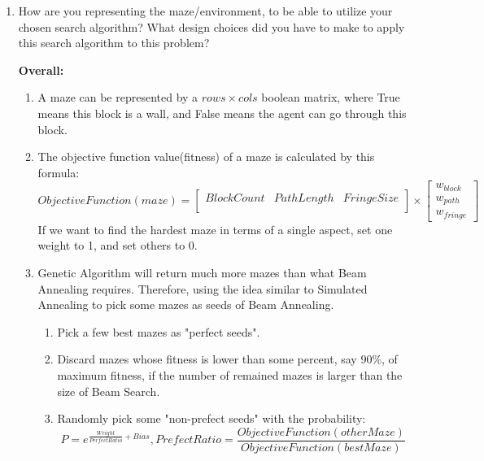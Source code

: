 \documentclass[letter]{article}
\begin{document}
\begin{enumerate}[resume]
\begin{enumerate}
			\item {How are you representing the maze/environment, to be able to utilize your chosen search algorithm? What design choices did you have to make to apply this search algorithm to this problem?} 
			
			\textbf{Overall:}
			\begin{enumerate}
				\item {A maze can be represented by a $ rows \times cols $ boolean matrix, where True means this block is a wall, and False means the agent can go through this block.} \\
				
				\item {The objective function value(fitness) of a maze is calculated by this formula: $$ObjectiveFunction(maze) = 
					\begin{bmatrix}
						BlockCount & PathLength & FringeSize \\
					\end{bmatrix} 
					\times 
					\begin{bmatrix}
						w_{block} \\
						w_{path}\\
						w_{fringe} 
					\end{bmatrix}$$  If we want to find the hardest maze in terms of a single aspect, set one weight to 1, and set others to 0.} \\
				
				\item {Genetic Algorithm will return much more mazes than what Beam Annealing requires. Therefore, using the idea similar to Simulated Annealing to pick some mazes as seeds of Beam Annealing.} \\
				\begin{enumerate}
					\item {Pick a few best mazes as "perfect seeds".} \\
					
					\item {Discard mazes whose fitness is lower than some percent, say 90\%, of maximum fitness, if the number of remained mazes is larger than the size of Beam Search.} \\
					
					\item {Randomly pick some "non-prefect seeds" with the probability: $$P = e^{{\frac{Weight}{PerfectRatio}+Bias}}, PrefectRatio = \frac{ObjectiveFunction(otherMaze)}{ObjectiveFunction(bestMaze)}$$} \\
					

\end{enumerate}
\end{enumerate}
\end{enumerate}
\end{enumerate}
\end{document}
